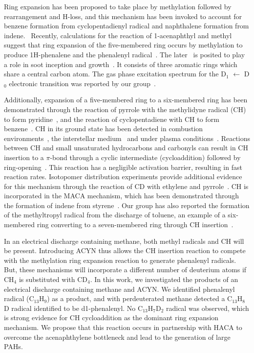 \documentclass[journal=jacsat,manuscript=article,layout=onecolumn]{achemso}
\begin{document}
Ring expansion has been proposed to take place by methylation followed by rearrangement and H-loss, and this mechanism has been invoked to account for benzene formation from cyclopentadienyl radical and naphthalene formation from indene.~\cite{mel96,mos96,sha09,meb16,jas13,zha19,meb17} Recently, calculations for the reaction of 1-acenaphthyl and methyl suggest that ring expansion of the five-membered ring occurs by methylation to produce 1H-phenalene and the phenalenyl radical~\cite{por20}. The later~\cite{mor11,oco17} is posited to play a role in soot inception and growth~\cite{joh18}. It consists of three aromatic rings which share a central carbon atom. The gas phase excitation spectrum for the D$_1$ $\leftarrow$ D$_0$ electronic transition was reported by our group~\cite{oco11}.

Additionally, expansion of a five-membered ring to a six-membered ring has been demonstrated through the reaction of pyrrole with the methylidyne radical (CH) to form pyridine~\cite{soo10}, and the reaction of cyclopentadiene with CH to form benzene~\cite{cas19}. CH in its ground state has been detected in combustion environments~\cite{lov11,tin11,zha12}, the interstellar medium~\cite{ger10,ada41} and under plasma conditions~\cite{zho06}. Reactions between CH and small unsaturated hydrocarbons and carbonyls can result in CH insertion to a $\pi$-bond through a cyclic intermediate (cycloaddition) followed by ring-opening~\cite{gou09,tre13,gou12,tre16,cas19}. This reaction has a negligible activation barrier, resulting in fast reaction rates. Isotopomer distribution experiments provide additional evidence for this mechanism through the reaction of CD with ethylene and pyrrole~\cite{gou09,soo10}. CH is incorporated in the MACA mechanism, which has been demonstrated through the formation of indene from styrene~\cite{dod21}. Our group has also reported the formation of the methyltropyl radical from the discharge of toluene, an example of a six-membered ring converting to a seven-membered ring through CH insertion~\cite{rei18}. %

In an electrical discharge containing methane, both methyl radicals and CH will be present. Introducing ACYN thus allows the CH insertion reaction to compete with the methylation ring expansion reaction to generate phenalenyl radicals. But, these mechanisms will incorporate a different number of deuterium atoms if CH$_4$ is substituted with CD$_4$. In this work, we investigated the products of an electrical discharge containing methane and ACYN. We identified phenalenyl radical (C$_{13}$H$_9$) as a product, and with perdeuterated methane detected a C$_{13}$H$_8$D radical identified to be d1-phenalenyl. No C$_{13}$H$_7$D$_2$ radical was observed, which is strong evidence for CH cycloaddition as the dominant ring expansion mechanism. We propose that this reaction occurs in partnership with HACA to overcome the acenaphthylene bottleneck and lead to the generation of large PAHs.
\end{document}
